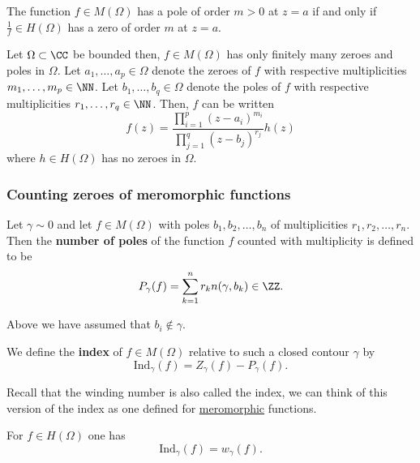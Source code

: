 \documentclass[12pt, a4paper]{article}
\begin{document}
\begin{proposition}
    The function \(f \in M(\Omega)\) has a pole of order \(m>0\) at \(z=a\) if and only if \(\frac{1}{f} \in H(\Omega)\) has a zero of order \(m\) at \(z=a\).
\end{proposition}

\begin{mdprop}
    Let \(\Omega \subset \CC\) be bounded then, \(f \in M(\Omega)\) has only finitely many zeroes and poles in \(\Omega\). Let \(a_1,\ldots, a_p \in \Omega\) denote the zeroes of \(f\) with respective multiplicities \(m_1,\ldots,m_p \in \NN\). Let \(b_1, \ldots,b_q \in \Omega\) denote the poles of \(f\) with respective multiplicities \(r_1, \ldots, r_q \in \NN\). Then, \(f\) can be written 
    \[f(z) = \frac{\prod_{i=1}^{p}(z-a_i)^{m_i}}{\prod_{j=1}^{q}(z-b_j)^{r_j}}h(z)\]
    where \(h \in H(\Omega)\) has no zeroes in \(\Omega\).
\end{mdprop}

\subsubsection{Counting zeroes of meromorphic functions}

\begin{definition}
    Let \(\gamma \sim 0\) and let \(f \in M(\Omega)\) with poles \(b_1,b_2,\ldots,b_n\) of multiplicities \(r_1,r_2,\ldots,r_n\). Then the \textbf{number of poles} of the function \(f\) counted with multiplicity is defined to be 
    \[P_{\gamma}(f) = \sum_{k=1}^n r_k n(\gamma,b_k) \in \ZZ.\]
\end{definition}

\begin{mdremark}
    Above we have assumed that \(b_i \not\in \gamma\).
\end{mdremark}

\begin{definition}
    We define the \textbf{index} of \(f \in M(\Omega)\) relative to such a closed contour \(\gamma\) by 
    \[\text{Ind}_{\gamma}(f)=Z_{\gamma}(f)-P_{\gamma}(f).\]
\end{definition}

\begin{mdremark}
    Recall that the winding number is also called the index, we can think of this version of the index as one defined for \ul{meromorphic} functions.
\end{mdremark}

\begin{mdthm}
    For \(f \in H(\Omega)\) one has 
    \[\text{Ind}_{\gamma}(f)=w_{\gamma}(f).\]
\end{mdthm}
\end{document}
